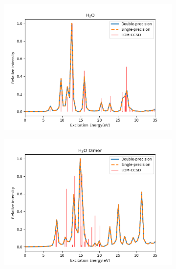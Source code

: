 \begin{figure}
     \centering
     \begin{subfigure}{0.475\textwidth}
         \centering
         \includegraphics[width=\textwidth]{ch3/Figs/1-1.png}
         \label{fig:sp-monomer}
     \end{subfigure}
     \hfill
     \begin{subfigure}{0.475\textwidth}
         \centering
         \includegraphics[width=\textwidth]{ch3/Figs/1-2.png}
         \label{fig:sp-dimer}
     \end{subfigure}
     \vfill
     \begin{subfigure}{0.475\textwidth}
         \centering

\end{subfigure}
\end{figure}
